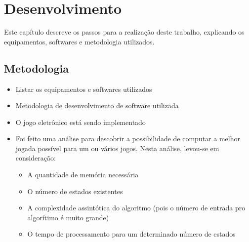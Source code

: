 \chapter[Desenvolvimento]{Desenvolvimento}
\label{cha:desenvolvimento}
	Este capítulo descreve os passos para a realização deste trabalho, explicando os equipamentos, softwares e metodologia utilizados.

\section{Metodologia}\label{metodologia}

\label{sec:metodologia}

\begin{itemize}
\item
  Listar os equipamentos e softwares utilizados
\item
  Metodologia de desenvolvimento de software utilizada
\item
  O jogo eletrônico está sendo implementado
\item
  Foi feito uma análise para descobrir a possibilidade de computar a
  melhor jogada possível para um ou vários jogos. Nesta análise,
  levou-se em consideração:

  \begin{itemize}
  \tightlist
  \item
    A quantidade de memória necessária
  \item
    O número de estados existentes
  \item
    A complexidade assintótica do algoritmo (pois o número de entrada
    pro algorítimo é muito grande)
  \item
    O tempo de processamento para um determinado número de estados
  \end{itemize}
\end{itemize}
